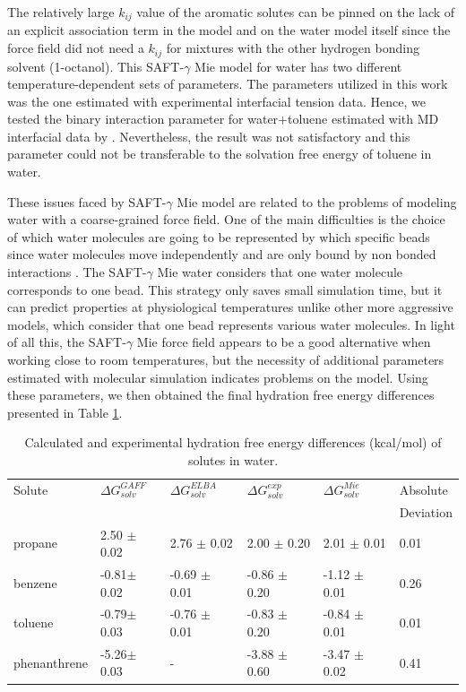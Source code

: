 The relatively large $k_{ij}$ value of the aromatic solutes can be pinned on the lack of an explicit association term in the model and on the water model itself since the force field did not need a $k_{ij}$ for mixtures with the other hydrogen bonding solvent (1-octanol).  This SAFT-$\gamma$ Mie model for water \cite{lobanova2016} has two different temperature-dependent sets of parameters. The parameters utilized in this work was the one estimated with experimental interfacial tension data. Hence, we tested the binary interaction parameter for water+toluene estimated with MD interfacial data by . Nevertheless, the result was not satisfactory and this parameter could not be transferable to the solvation free energy of toluene in water. 

These issues faced by SAFT-$\gamma$ Mie model are related to the problems of modeling water with a coarse-grained force field. One of the main difficulties is the choice of which water molecules are going to be represented by which specific beads since water molecules move independently and are only bound by non bonded interactions \cite{hadley2010,hadley2012}. The  SAFT-$\gamma$ Mie water considers that one water molecule corresponds to one bead. This strategy only saves small simulation time, but it can predict properties at physiological temperatures unlike other more aggressive models, which consider that one bead represents various water molecules. In light of all this, the SAFT-$\gamma$ Mie force field appears to be a good alternative when working close to room temperatures, but the necessity of additional parameters estimated with molecular simulation indicates problems on the model. Using these parameters, we then obtained the final hydration free energy differences presented in Table \ref{tbl:solv2}. 

\begin{table}[H]
  \centering
  \caption{Calculated and experimental hydration free energy differences  (kcal/mol) of solutes in water.}
  \label{tbl:solv2}
  \begin{tabular}{llllll}
    \hline
     Solute      & $\Delta G_{solv}^{GAFF}$ & $\Delta G_{solv}^{ELBA}$ & $\Delta G_{solv}^{exp}$ & $\Delta G_{solv}^{Mie}$ & Absolute \\
     & & & & & Deviation \\
    \hline
    propane          &2.50 $\pm$0.02 & 2.76 $\pm$ 0.02&  2.00 $\pm$ 0.20 & 2.01 $\pm$ 0.01     & 0.01 \\
    benzene          &-0.81$\pm$0.02& -0.69 $\pm$ 0.01& -0.86 $\pm$ 0.20 & -1.12 $\pm$ 0.01    &  0.26\\  
    toluene          &-0.79$\pm$0.03& -0.76 $\pm$ 0.01& -0.83 $\pm$ 0.20 & -0.84 $\pm$ 0.01    &  0.01\\
    phenanthrene    &-5.26$\pm$0.03& -                & -3.88 $\pm$ 0.60 & -3.47 $\pm$ 0.02    & 0.41 \\
    \hline
  \end{tabular}

\end{table}

